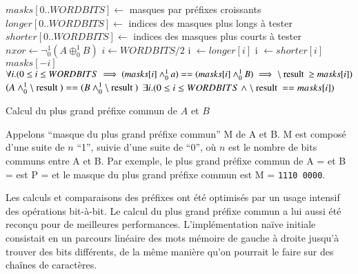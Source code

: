 %

\newcommand{\Band}{\land_0^1}
\newcommand{\Bor}{\lor_0^1}
\newcommand{\Bnot}{\lnot_0^1}
\newcommand{\Bxor}{\oplus_0^1}
\newcommand{\mresult}{\mbox{\lstinline'\\result'}}

\begin{algorithm}
\begin{algorithmic}
\State $masks[ 0 .. WORDBITS ] \gets$ masques par préfixes croissants
\State $longer[ 0 .. WORDBITS ] \gets$ indices des masques plus longs à tester
\State $shorter[ 0 .. WORDBITS ] \gets$ indices des masques plus courts à tester
\State $nxor \gets \Bnot(A \Bxor B)$
\State $i \gets WORDBITS/2$
    \State i $\gets longer[i]$ 
  \Else
    \State i $\gets shorter[i]$
  \EndIf
\EndWhile\\
\Return $masks[-i]$
\Ensure $\forall i. (0 \le i \le WORDBITS \implies (masks[i] \Band a) == (masks[i] \Band B) \implies \mresult \ge masks[i])$
\Ensure $(A \Band \mresult) == (B \Band \mresult)$
\Ensure $\exists i. (0 \le i \le WORDBITS \land \mresult == masks[i])$
\end{algorithmic}
\caption{Calcul du plus grand préfixe commun de $A$ et $B$
  \label{algo:prefix}}
\end{algorithm}


Appelons ``masque du plus grand préfixe commun'' M de A et B. M est composé
d'une suite de $n$ ``1'', suivie d'une suite de ``0'', où $n$ est le nombre de
bits communs entre A et B.
Par exemple, le plus grand préfixe commun de A =  et
B =  est P =   et le
masque du plus grand préfixe commun est M = \texttt{1110\,0000}.

Les calculs et comparaisons des préfixes ont été optimisés par un usage
intensif des opérations bit-à-bit.
Le calcul du plus grand préfixe commun a lui aussi été reconçu pour de
meilleures performances.
L'implémentation naïve initiale consistait en un parcours linéaire des mots
mémoire de gauche à droite jusqu'à trouver des bits différents, de la même
manière qu'on pourrait le faire sur des chaînes de caractères.

